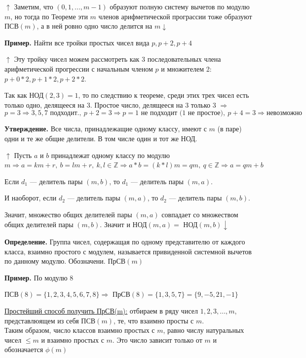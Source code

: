 \documentclass{article}
\begin{document}
            $\uparrow$ Заметим, что $(0,1,...,m - 1)$ образуют полную систему вычетов по модулю $m$, но тогда по Теореме эти $m$ членов арифметической програссии тоже образуют $\textrm{ПСВ}(m)$, а в ней ровно одно число делится на $m \downarrow$
            
            \textbf{Пример.} Найти все тройки простых чисел вида $p, p + 2, p + 4$
            
            $\uparrow$ Эту тройку чисел можем рассмотреть как 3 последовательных члена арифметической прогрессии с начальным членом $p$ и множителем 2: $p + 0*2, p + 1*2, p + 2*2$.
            
            Так как $\textrm{НОД}(2,3) = 1$, то по следствию к теореме, среди этих трех чисел есть только одно, делящееся на 3. Простое число, делящееся на 3 только 3 $\Rightarrow$
            \[ p = 3 \Rightarrow 3, 5, 7 \textrm{ подходит.},\ p + 2 = 3 \Rightarrow p = 1 \textrm{ не подходит (1 не простое)},\ p + 4 = 3 \Rightarrow \textrm{невозможно} \]
    		
            \textbf{Утверждение.} Все числа, принадлежащие одному классу, имеют с $m$ (в паре) одни и те же общие делители. В том числе один и тот же НОД.
            
            $\uparrow$ Пусть $a$ и $b$ принадлежат одному классу по модулю $m \Rightarrow a = km + r,\ b = lm + r,\ k,l \in \mathbb{Z} \Rightarrow a*b = (k*l)m = qm,\ q \in \mathbb{Z} \Rightarrow a = qm + b$  
            
            Если $d_1$ --- делитель пары $(m, b)$, то $d_1$ --- делитель пары $(m, a)$.
            
            И наоборот, если $d_2$ --- делитель пары $(m, a)$, то $d_2$ --- делитель пары $(m, b)$.
            
            Значит, множество общих делителей пары $(m, a)$ совпадает со множеством общих делителей пары $(m, b)$. Значит и НОД$(m, a) = $ НОД$(m, b) \downarrow$ 
            
            \textbf{Определение.} Группа чисел, содержащая по одному представителю от каждого класса, взаимно простого с модулем, называется привиденной системной вычетов по данному модулю. Обозначени. ПрСВ$(m)$
            
            \textbf{Пример.} По модулю 8
            
            ПСВ$(8) = \{1, 2, 3, 4, 5, 6, 7, 8\} \Rightarrow$ ПрСВ$(8) = \{1,3,5,7\} = \{9, -5, 21, -1\}$
            
            \underline{Простейший способ получить ПрСВ(m):} отбираем в ряду чисел $1,2,3,...,m$, представлюящем из себя ПСВ$(m)$, те, что взаимно просты с $m$.\\
            Таким образом, число классов взаимно простых с $m$, равно числу натуральных чисел $\leq m$ и взаимно простых с $m$. Это число зависит только от $m$ и обозначается $\phi(m)$
        
\end{document}
